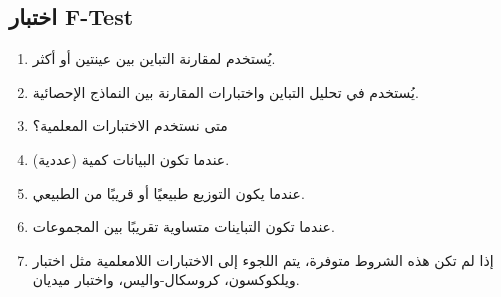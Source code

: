 \subsection{اختبار F-Test}
\begin{enumerate}[label=$\bullet$]
\item  	يُستخدم لمقارنة التباين بين عينتين أو أكثر.
\item  	يُستخدم في تحليل التباين واختبارات المقارنة بين النماذج الإحصائية.
\item 	متى نستخدم الاختبارات المعلمية؟
\item  	عندما تكون البيانات كمية (عددية).
\item  	عندما يكون التوزيع طبيعيًا أو قريبًا من الطبيعي.
\item 	عندما تكون التباينات متساوية تقريبًا بين المجموعات.
\item  	إذا لم تكن هذه الشروط متوفرة، يتم اللجوء إلى الاختبارات اللامعلمية مثل اختبار ويلكوكسون، كروسكال-واليس، واختبار ميديان.
\end{enumerate}
